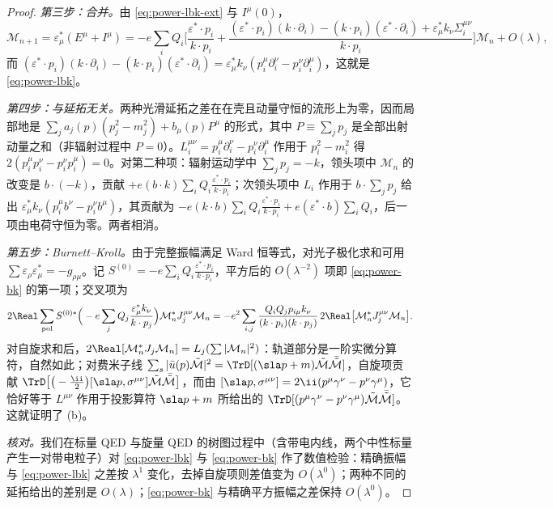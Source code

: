 \begin{proof}
\emph{第三步：合并。}由 \eqref{eq:power-lbk-ext} 与 $I^\mu(0)$，
\begin{equation*}
\mathcal M_{n+1}=\varepsilon^*_\mu(E^\mu+I^\mu)=-e\sum_iQ_i\Big[\frac{\varepsilon^*\!\cdot p_i}{k\cdot p_i}+\frac{(\varepsilon^*\!\cdot p_i)(k\cdot\partial_i)-(k\cdot p_i)(\varepsilon^*\!\cdot\partial_i)+\varepsilon^*_\mu k_\nu\Sigma_i^{\mu\nu}}{k\cdot p_i}\Big]\mathcal M_n+O(\lambda),
\end{equation*}
而 $(\varepsilon^*\!\cdot p_i)(k\cdot\partial_i)-(k\cdot p_i)(\varepsilon^*\!\cdot\partial_i)=\varepsilon^*_\mu k_\nu(p_i^\mu\partial_i^\nu-p_i^\nu\partial_i^\mu)$，这就是 \eqref{eq:power-lbk}。

\emph{第四步：与延拓无关。}两种光滑延拓之差在在壳且动量守恒的流形上为零，因而局部地是 $\sum_ja_j(p)(p_j^2-m_j^2)+b_\mu(p)P^\mu$ 的形式，其中 $P\equiv\sum_jp_j$ 是全部出射动量之和（非辐射过程中 $P=0$）。$L_i^{\mu\nu}=p_i^\mu\partial_i^\nu-p_i^\nu\partial_i^\mu$ 作用于 $p_i^2-m_i^2$ 得 $2(p_i^\mu p_i^\nu-p_i^\nu p_i^\mu)=0$。对第二种项：辐射运动学中 $\sum_jp_j=-k$，领头项中 $\mathcal M_n$ 的改变是 $b\cdot(-k)$，贡献 $+e(b\cdot k)\sum_iQ_i\frac{\varepsilon^*\cdot p_i}{k\cdot p_i}$；次领头项中 $L_i$ 作用于 $b\cdot\sum_jp_j$ 给出 $\varepsilon^*_\mu k_\nu(p_i^\mu b^\nu-p_i^\nu b^\mu)$，其贡献为 $-e(k\cdot b)\sum_iQ_i\frac{\varepsilon^*\cdot p_i}{k\cdot p_i}+e(\varepsilon^*\!\cdot b)\sum_iQ_i$，后一项由电荷守恒为零。两者相消。

\emph{第五步：Burnett--Kroll。}由于完整振幅满足 Ward 恒等式，对光子极化求和可用 $\sum\varepsilon_\rho\varepsilon^*_\mu=-g_{\rho\mu}$。记 $S^{(0)}=-e\sum_iQ_i\frac{\varepsilon^*\cdot p_i}{k\cdot p_i}$，平方后的 $O(\lambda^{-2})$ 项即 \eqref{eq:power-bk} 的第一项；交叉项为
\begin{equation*}
2\Real\sum_{\mathrm{pol}}S^{(0)*}\Big(-e\sum_jQ_j\frac{\varepsilon^*_\mu k_\nu}{k\cdot p_j}\Big)\mathcal M_n^*J_j^{\mu\nu}\mathcal M_n
=-e^2\sum_{i,j}\frac{Q_iQ_jp_{i\mu}k_\nu}{(k\cdot p_i)(k\cdot p_j)}\,2\Real\big[\mathcal M_n^*J_j^{\mu\nu}\mathcal M_n\big].
\end{equation*}
对自旋求和后，$2\Real[\mathcal M_n^*J_j\mathcal M_n]=L_j(\sum|\mathcal M_n|^2)$：轨道部分是一阶实微分算符，自然如此；对费米子线 $\sum_s|\bar u(p)\tilde{\mathcal M}|^2=\TrD[(\sla p+m)\tilde{\mathcal M}\bar{\tilde{\mathcal M}}]$，自旋项贡献 $\TrD\big[\big(-\frac{\ii}{2}\big)[\sla p,\sigma^{\mu\nu}]\tilde{\mathcal M}\bar{\tilde{\mathcal M}}\big]$，而由 $[\sla p,\sigma^{\mu\nu}]=2\ii(p^\mu\gamma^\nu-p^\nu\gamma^\mu)$，它恰好等于 $L^{\mu\nu}$ 作用于投影算符 $\sla p+m$ 所给出的 $\TrD[(p^\mu\gamma^\nu-p^\nu\gamma^\mu)\tilde{\mathcal M}\bar{\tilde{\mathcal M}}]$。这就证明了 (b)。

\emph{核对。}我们在标量 QED 与旋量 QED 的树图过程中（含带电内线，两个中性标量产生一对带电粒子）对 \eqref{eq:power-lbk} 与 \eqref{eq:power-bk} 作了数值检验：精确振幅与 \eqref{eq:power-lbk} 之差按 $\lambda^1$ 变化，去掉自旋项则差值变为 $O(\lambda^0)$；两种不同的延拓给出的差别是 $O(\lambda)$；\eqref{eq:power-bk} 与精确平方振幅之差保持 $O(\lambda^0)$。
\end{proof}

